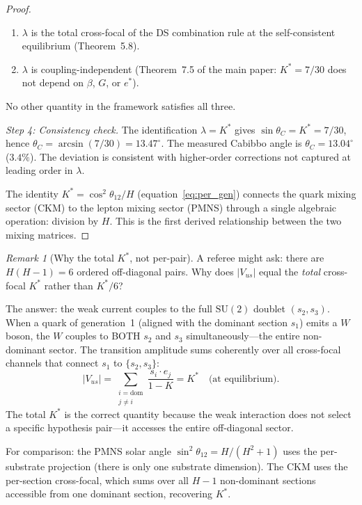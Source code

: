 \documentclass[11pt,a4paper]{article}
\theoremstyle{definition}
\theoremstyle{remark}
\newtheorem{remark}[theorem]{Remark}
\newcommand{\SU}{\mathrm{SU}}
\begin{document}
\begin{proof}
\begin{enumerate}[nosep]
Actually: $K^* \cdot H + \sin^2\theta_{12} = (7/30)\cdot 3 + 3/10 = 7/10 + 3/10 = 1$. So $K^*\cdot H + \alpha = 1$, which is $1-\alpha = K^*\cdot H$, i.e.\ $(1-\alpha)/H = K^*$. This is Step 1 restated.
\item $\lambda$ is the total cross-focal of the DS combination rule at the self-consistent equilibrium (Theorem~5.8).
\item $\lambda$ is coupling-independent (Theorem~7.5 of the main paper: $K^*=7/30$ does not depend on $\beta$, $G$, or $e^*$).
\end{enumerate}
No other quantity in the framework satisfies all three.

\emph{Step 4: Consistency check.}
The identification $\lambda = K^*$ gives $\sin\theta_C = K^* = 7/30$, hence $\theta_C = \arcsin(7/30) = 13.47^\circ$. The measured Cabibbo angle is $\theta_C = 13.04^\circ$ ($3.4\%$). The deviation is consistent with higher-order corrections not captured at leading order in $\lambda$.

The identity $K^* = \cos^2\theta_{12}/H$ (equation~\ref{eq:per_gen}) connects the quark mixing sector (CKM) to the lepton mixing sector (PMNS) through a single algebraic operation: division by $H$. This is the first derived relationship between the two mixing matrices.
\end{proof}

\begin{remark}[Why the total $K^*$, not per-pair]\label{rem:why_total}
A referee might ask: there are $H(H-1) = 6$ ordered off-diagonal pairs. Why does $|V_{us}|$ equal the \emph{total} cross-focal $K^*$ rather than $K^*/6$?

The answer: the weak current couples to the full $\SU(2)$ doublet $(s_2, s_3)$. When a quark of generation~1 (aligned with the dominant section $s_1$) emits a $W$ boson, the $W$ couples to BOTH $s_2$ and $s_3$ simultaneously---the entire non-dominant sector. The transition amplitude sums coherently over all cross-focal channels that connect $s_1$ to $\{s_2, s_3\}$:
\[
|V_{us}| = \sum_{\substack{i=\text{dom}\\j\neq i}} \frac{s_i \cdot e_j}{1-K} = K^* \quad\text{(at equilibrium)}.
\]
The total $K^*$ is the correct quantity because the weak interaction does not select a specific hypothesis pair---it accesses the entire off-diagonal sector.

For comparison: the PMNS solar angle $\sin^2\theta_{12} = H/(H^2+1)$ uses the per-substrate projection (there is only one substrate dimension). The CKM uses the per-section cross-focal, which sums over all $H-1$ non-dominant sections accessible from one dominant section, recovering $K^*$.
\end{remark}
\end{document}

